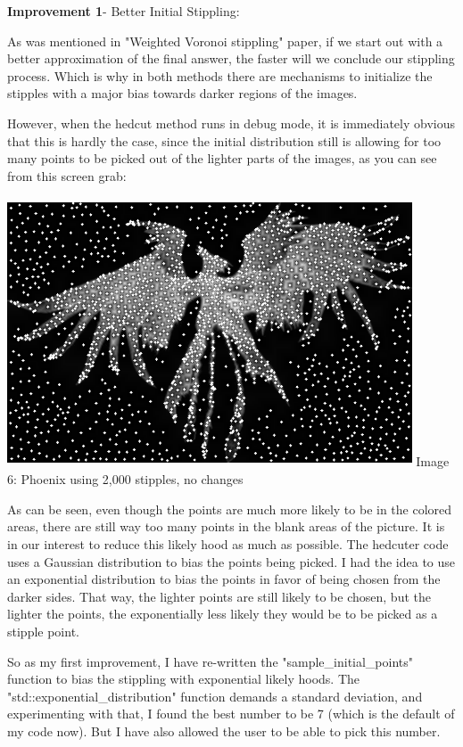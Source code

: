 \documentclass[11pt]{article}
\begin{document}
\textbf{Improvement 1}- Better Initial Stippling: 

As was mentioned in "Weighted Voronoi stippling" paper, if we start out with a better approximation of the final answer, the faster will we conclude our stippling process. Which is why in both methods there are mechanisms to initialize the stipples with a major bias towards darker regions of the images.

However, when the hedcut method runs in debug mode, it is immediately obvious that this is hardly the case, since the initial distribution still is allowing for too many points to be picked out of the lighter parts of the images, as you can see from this screen grab:
\newline

\includegraphics[width=12cm, height=8cm]{Pheonix-Debug-Normal.png} 
\newline Image 6: Phoenix using 2,000 stipples, no changes

As can be seen, even though the points are much more likely to be in the colored areas, there are still way too many points in the blank areas of the picture. It is in our interest to reduce this likely hood as much as possible. The hedcuter code uses a Gaussian distribution to bias the points being picked. I had the idea to use an exponential distribution to bias the points in favor of being chosen from the darker sides. That way, the lighter points are still likely to be chosen, but the lighter the points, the exponentially less likely they would be to be picked as a stipple point. 

So as my first improvement, I have re-written the "sample\_initial\_points" function to bias the stippling with exponential likely hoods. The "std::exponential\_distribution" function demands a standard deviation, and experimenting with that, I found the best number to be 7 (which is the default of my code now). But I have also allowed the user to be able to pick this number.
\end{document}

